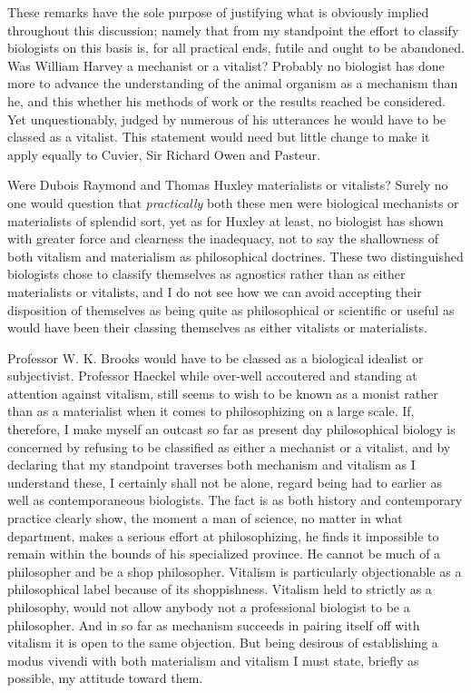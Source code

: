 \documentclass[a4paper, 11pt, oneside, polutonikogreek, english]{article}
\begin{document}
These remarks have the sole purpose of justifying what is obviously implied throughout this discussion; namely that from my standpoint the effort to classify biologists on this basis is, for all practical ends, futile and ought to be abandoned. Was William Harvey a mechanist or a vitalist? Probably no biologist has done more to advance the understanding of the animal organism as a mechanism than he, and this whether his methods of work or the results reached be considered. Yet unquestionably, judged by numerous of his utterances he would have to be classed as a vitalist. This statement would need but little change to make it apply equally to Cuvier, Sir Richard Owen and Pasteur.

Were Dubois Raymond and Thomas Huxley materialists or vitalists? Surely no one would question that \emph{practically} both these men were biological mechanists or materialists of splendid sort, yet as for Huxley at least, no biologist has shown with greater force and clearness the inadequacy, not to say the shallowness of both vitalism and materialism as philosophical doctrines. These two distinguished biologists chose to classify themselves as agnostics rather than as either materialists or vitalists, and I do not see how we can avoid accepting their disposition of themselves as being quite as philosophical or scientific or useful as would have been their classing themselves as either vitalists or materialists.

Professor W. K. Brooks would have to be classed as a biological idealist or subjectivist. Professor Haeckel while over-well accoutered and standing at attention against vitalism, still seems to wish to be known as a monist rather than as a materialist when it comes to philosophizing on a large scale. If, therefore, I make myself an outcast so far as present day philosophical biology is concerned by refusing to be classified as either a mechanist or a vitalist, and by declaring that my standpoint traverses both mechanism and vitalism as I understand these, I certainly shall not be alone, regard being had to earlier as well as contemporaneous biologists. The fact is as both history and contemporary practice clearly show, the moment a man of science, no matter in what department, makes a serious effort at philosophizing, he finds it impossible to remain within the bounds of his specialized province. He cannot be much of a philosopher and be a shop philosopher. Vitalism is particularly objectionable as a philosophical label because of its shoppishness. Vitalism held to strictly as a philosophy, would not allow anybody not a professional biologist to be a philosopher. And in so far as mechanism succeeds in pairing itself off with vitalism it is open to the same objection. But being desirous of establishing a modus vivendi with both materialism and vitalism I must state, briefly as possible, my attitude toward them.
\end{document}
